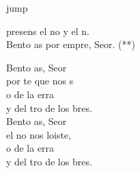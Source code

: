 \begin{cancion}jump\\
	\begin{chorus}%
		 presens el no y el n.\\
		Bento as por empre, Seor. (**)\jump\\
	\end{chorus}%
	Bento as, Seor \\
	por te  que nos s \\
	o de la erra\\
	y del tro de los bres.\\
	\jump
	Bento as, Seor \\
	el no  nos loiste, \\
	o de la erra\\
	y del tro de los bres.\\
\end{cancion}%

